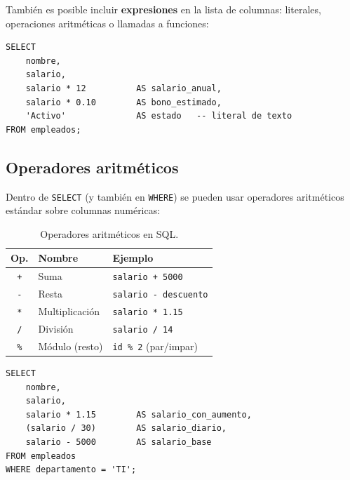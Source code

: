 También es posible incluir \textbf{expresiones} en la lista de
columnas: literales, operaciones aritméticas o llamadas a funciones:

\begin{lstlisting}[caption={Columnas calculadas y literales en SELECT.}]
SELECT
    nombre,
    salario,
    salario * 12          AS salario_anual,
    salario * 0.10        AS bono_estimado,
    'Activo'              AS estado   -- literal de texto
FROM empleados;
\end{lstlisting}

\subsection{Operadores aritméticos}

Dentro de \texttt{SELECT} (y también en \texttt{WHERE}) se pueden
usar operadores aritméticos estándar sobre columnas numéricas:

\begin{table}[H]
\centering
\small
\renewcommand{\arraystretch}{1.4}
\begin{tabularx}{\linewidth}{@{} c l X @{}}
\toprule
\textbf{Op.} & \textbf{Nombre} & \textbf{Ejemplo} \\
\midrule
\texttt{+}  & Suma            & \texttt{salario + 5000} \\
\texttt{-}  & Resta           & \texttt{salario - descuento} \\
\texttt{*}  & Multiplicación  & \texttt{salario * 1.15} \\
\texttt{/}  & División        & \texttt{salario / 14} \\
\texttt{\%} & Módulo (resto)  & \texttt{id \% 2} (par/impar) \\
\bottomrule
\end{tabularx}
\caption{Operadores aritméticos en SQL.}
\label{tab:operadores-aritmeticos}
\end{table}

\begin{lstlisting}[caption={Uso de operadores aritméticos.}]
SELECT
    nombre,
    salario,
    salario * 1.15        AS salario_con_aumento,
    (salario / 30)        AS salario_diario,
    salario - 5000        AS salario_base
FROM empleados
WHERE departamento = 'TI';
\end{lstlisting}

